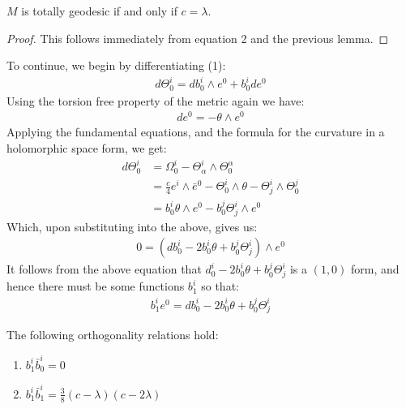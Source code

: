 \begin{cor} $M$ is totally geodesic if and only if $c = \lambda$.
\end{cor}
%
\begin{proof} This follows immediately from equation 2 and the previous lemma.
\end{proof}

To continue, we begin by differentiating (1):
%
\begin{align*}
d \Theta^i_0 = d b^i_0 \wedge e^0 + b^i_0 d e^0
\end{align*}
%
Using the torsion free property of the metric again we have:
%
\begin{align*}
d e^0 = - \theta \wedge e^0
\end{align*}
%
Applying the fundamental equations, and the formula for the curvature in a holomorphic space form, we get:
%
\begin{align*}
d \Theta^i_0 &= \Omega^i_0 - \Theta^i_{\alpha} \wedge \Theta^{\alpha}_0 \\
&= \frac{c}{4} e^i \wedge \bar{e}^0 - \Theta^i_0 \wedge \theta - \Theta^i_j \wedge \Theta^j_0 \\
&= b^i_0 \theta \wedge e^0 - b^j_0 \Theta^i_j \wedge e^0
\end{align*}
%
Which, upon substituting into the above, gives us:
%
\begin{align*}
0 = ( d b^i_0 - 2 b^i_0 \theta + b^j_0 \Theta^i_j ) \wedge e^0 
\end{align*}
%
It follows from the above equation that $d^i_0 - 2 b^i_0 \theta + b^j_0 \Theta^i_j$ is a $(1,0)$ form, and hence there must be some functions $b^i_1$ so that:
%
\begin{align}
b^i_1 e^0 = d b^i_0 - 2 b^i_0 \theta + b^j_0 \Theta^i_j  
\end{align}

\begin{lem} The following orthogonality relations hold:
%
\begin{enumerate}
\item $b^i_1 \bar{b}^i_0 = 0$
\item $b^i_1 \bar{b}^i_1 = \frac{3}{8}(c - \lambda)(c - 2 \lambda)$
\end{enumerate}
%
\end{lem}

